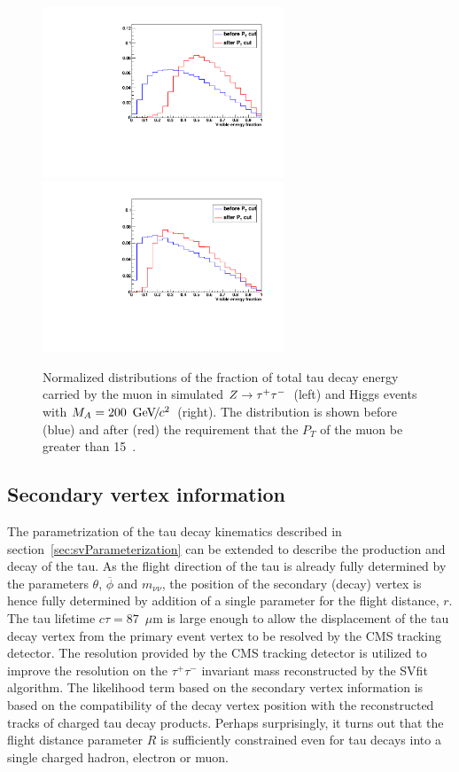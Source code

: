 \begin{figure}[t]
\begin{center}
\includegraphics*[width=72mm]{svfit_chapter/figures/scuplting_Ztautau_powheg_muon.pdf}
\includegraphics*[width=72mm]{svfit_chapter/figures/scuplting_A200_muon.pdf}
\caption{\captiontext Normalized distributions of the fraction of total tau
decay energy carried by the muon in simulated $Z\to\tau^+\tau^-$~(left) and Higgs events
with \mbox{$M_{A} = 200~{\,\text{Ge\hspace{-.08em}V\hspace{-0.16em}/\hspace{-0.08em}}c^\text{2}}$}~(right).  The distribution is shown before
(blue) and after (red) the requirement that the $P_T$ of the muon be greater
than 15~\GeVc.} \label{fig:ptBalancePtVisCutsCompareMasses}
\end{center}
\end{figure} 

\subsection{Secondary vertex information} 

The parametrization of the tau decay kinematics described in
section~\ref{sec:svParameterization} can be extended to describe the production
and decay of the tau.  As the flight direction of the tau is already fully
determined by the parameters $\theta$, $\overline{\phi}$ and $m_{\nu\nu}$, the
position of the secondary (decay) vertex is hence fully determined by addition
of a single parameter for the flight distance, $r$.  The tau lifetime $c\tau =
87$~$\mu$m is large enough to allow the displacement of the tau decay vertex
from the primary event vertex to be resolved by the CMS tracking detector.  The
resolution provided by the CMS tracking detector is utilized to improve the
resolution on the $\tau^{+} \tau^{-}$ invariant mass reconstructed by the SVfit
algorithm.  The likelihood term based on the secondary vertex information is
based on the compatibility of the decay vertex position with the reconstructed
tracks of charged tau decay products.  Perhaps surprisingly, it turns out that
the flight distance parameter $R$ is sufficiently constrained even for tau
decays into a single charged hadron, electron or muon.

